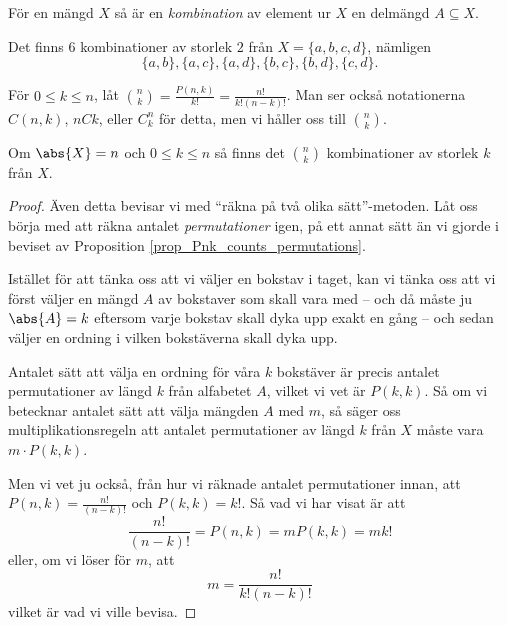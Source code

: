 \documentclass{tufte-handout}
\begin{document}
\begin{definition}
	För en mängd $X$ så är en \emph{kombination} av element ur $X$ en delmängd $A \subseteq X$.
\end{definition}

\begin{example}
	Det finns $6$ kombinationer av storlek $2$ från $X = \{a,b,c,d\}$, nämligen
	$$\{a,b\}, \{a,c\},\{a,d\},\{b,c\},\{b,d\},\{c,d\}.$$
\end{example}

\begin{definition}
	För $0 \leq k \leq n$, låt $\binom{n}{k} = \frac{P(n,k)}{k!} = \frac{n!}{k!(n-k)!}$. Man ser också notationerna $C(n,k)$, $nCk$, eller $C^n_k$ för detta, men vi håller oss till $\binom{n}{k}$. 
\end{definition}

\begin{proposition}
	Om $\abs{X} = n$ och $0 \leq k \leq n$ så finns det $\binom{n}{k}$ kombinationer av storlek $k$ från $X$.
	\begin{proof}
		Även detta bevisar vi med ``räkna på två olika sätt''-metoden. Låt oss börja med att räkna antalet \emph{permutationer} igen, på ett annat sätt än vi gjorde i beviset av Proposition \ref{prop_Pnk_counts_permutations}.

		Istället för att tänka oss att vi väljer en bokstav i taget, kan vi tänka oss att vi först väljer en mängd $A$ av bokstaver som skall vara med -- och då måste ju $\abs{A} = k$ eftersom varje bokstav skall dyka upp exakt en gång -- och sedan väljer en ordning i vilken bokstäverna skall dyka upp.

		Antalet sätt att välja en ordning för våra $k$ bokstäver är precis antalet permutationer av längd $k$ från alfabetet $A$, vilket vi vet är $P(k,k)$. Så om vi betecknar antalet sätt att välja mängden $A$ med $m$, så säger oss multiplikationsregeln att antalet permutationer av längd $k$ från $X$ måste vara $m\cdot P(k,k)$.

		Men vi vet ju också, från hur vi räknade antalet permutationer innan, att $P(n,k) = \frac{n!}{(n-k)!}$ och $P(k,k) = k!$. Så vad vi har visat är att
		$$\frac{n!}{(n-k)!} = P(n,k) = m P(k,k) = m k!$$
		eller, om vi löser för $m$, att
		$$m = \frac{n!}{k!(n-k)!}$$
		vilket är vad vi ville bevisa.
	\end{proof}
\end{proposition}
\end{document}
